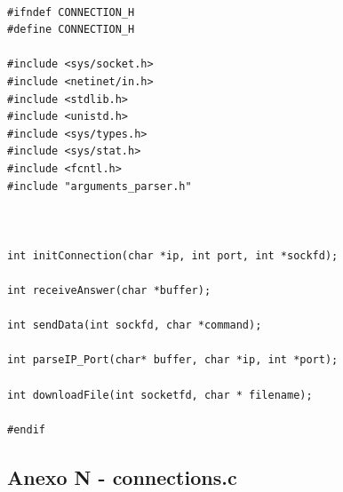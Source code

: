 \documentclass[11pt]{article}
\begin{document}
\begin{lstlisting}[style=CStyle]

#ifndef CONNECTION_H
#define CONNECTION_H

#include <sys/socket.h>
#include <netinet/in.h>
#include <stdlib.h>
#include <unistd.h>
#include <sys/types.h>
#include <sys/stat.h>
#include <fcntl.h>
#include "arguments_parser.h"



int initConnection(char *ip, int port, int *sockfd);

int receiveAnswer(char *buffer);

int sendData(int sockfd, char *command);

int parseIP_Port(char* buffer, char *ip, int *port);

int downloadFile(int socketfd, char * filename);

#endif

\end{lstlisting}

\subsection{ Anexo N - connections.c}
\end{document}
